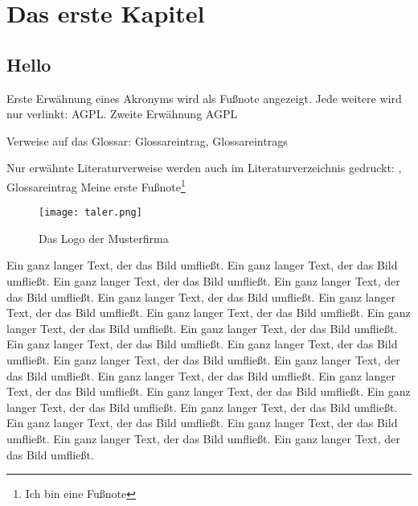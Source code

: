 
\chapter{Das erste Kapitel}
\section{Hello}
Erste Erwähnung eines Akronyms wird als Fußnote angezeigt. Jede weitere wird
nur verlinkt: \ac{AGPL}. Zweite Erwähnung \ac{AGPL}

Verweise auf das Glossar: \gls{Glossareintrag}, \glspl{Glossareintrag}

Nur erwähnte Literaturverweise werden auch im Literaturverzeichnis gedruckt:
\cite{baumgartner:2002}, \cite{dreyfus:1980}
\Gls{Glossareintrag}
Meine erste Fußnote\footnote{Ich bin eine Fußnote}

\begin{wrapfigure}{r}{.4\textwidth}
\texttt{[image: taler.png]}
\vspace{-15pt}
\caption{Das Logo der Musterfirma\footnotemark}
\end{wrapfigure}
Ein ganz langer Text, der das Bild umfließt. Ein ganz langer Text, der das Bild
umfließt. Ein ganz langer Text, der das Bild umfließt. Ein ganz langer Text, der
das Bild umfließt. Ein ganz langer Text, der das Bild umfließt. Ein ganz langer
Text, der das Bild umfließt. Ein ganz langer Text, der das Bild umfließt. Ein
ganz langer Text, der das Bild umfließt. Ein ganz langer Text, der das Bild
umfließt. Ein ganz langer Text, der das Bild umfließt. Ein ganz langer Text, der
das Bild umfließt. Ein ganz langer Text, der das Bild umfließt. Ein ganz langer Text, der das Bild
umfließt. Ein ganz langer Text, der das Bild umfließt. Ein ganz langer Text, der
das Bild umfließt. Ein ganz langer Text, der das Bild umfließt. Ein ganz langer
Text, der das Bild umfließt. Ein ganz langer Text, der das Bild umfließt. Ein
ganz langer Text, der das Bild umfließt. Ein ganz langer Text, der das Bild
umfließt. Ein ganz langer Text, der das Bild umfließt. Ein ganz langer Text, der
das Bild umfließt.
